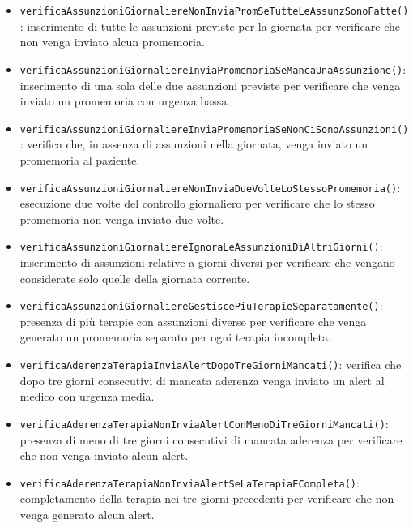 \begin{itemize}
	
	\item \texttt{verificaAssunzioniGiornaliereNonInviaPromSeTutteLeAssunzSonoFatte()}: inserimento di tutte le assunzioni previste per la giornata per verificare che non venga inviato alcun promemoria.
	
	\item \texttt{verificaAssunzioniGiornaliereInviaPromemoriaSeMancaUnaAssunzione()}: inserimento di una sola delle due assunzioni previste per verificare che venga inviato un promemoria con urgenza bassa.
	
	\item \texttt{verificaAssunzioniGiornaliereInviaPromemoriaSeNonCiSonoAssunzioni()}: verifica che, in assenza di assunzioni nella giornata, venga inviato un promemoria al paziente.
	
	\item \texttt{verificaAssunzioniGiornaliereNonInviaDueVolteLoStessoPromemoria()}: esecuzione due volte del controllo giornaliero per verificare che lo stesso promemoria non venga inviato due volte.
	
	\item \texttt{verificaAssunzioniGiornaliereIgnoraLeAssunzioniDiAltriGiorni()}: inserimento di assunzioni relative a giorni diversi per verificare che vengano considerate solo quelle della giornata corrente.
	
	\item \texttt{verificaAssunzioniGiornaliereGestiscePiuTerapieSeparatamente()}: presenza di più terapie con assunzioni diverse per verificare che venga generato un promemoria separato per ogni terapia incompleta.
	
	\item \texttt{verificaAderenzaTerapiaInviaAlertDopoTreGiorniMancati()}: verifica che dopo tre giorni consecutivi di mancata aderenza venga inviato un alert al medico con urgenza media.
	
	\item \texttt{verificaAderenzaTerapiaNonInviaAlertConMenoDiTreGiorniMancati()}: presenza di meno di tre giorni consecutivi di mancata aderenza per verificare che non venga inviato alcun alert.
	
	\item \texttt{verificaAderenzaTerapiaNonInviaAlertSeLaTerapiaECompleta()}: completamento della terapia nei tre giorni precedenti per verificare che non venga generato alcun alert.
	

\end{itemize}
